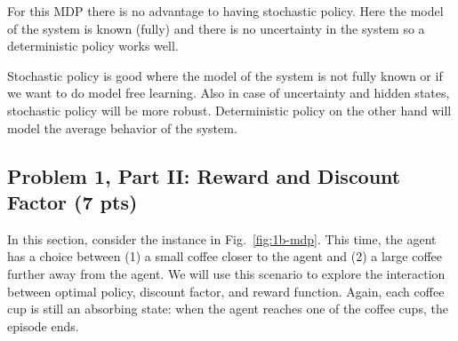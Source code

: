 \documentclass[12pt]{article}
\begin{document}
\begin{enumerate}[a)]
\begin{solution}
For this MDP there is no advantage to having stochastic policy. Here the model of the system is known (fully) and there is no uncertainty in the system so a deterministic policy works well.

Stochastic policy is good where the model of the system is not fully known or if we want to do model free learning. Also in case of uncertainty and hidden states, stochastic policy will be more robust. Deterministic policy on the other hand will model the average behavior of the system. 

\end{solution}

\end{enumerate}

\subsection*{Problem 1, Part II: Reward and Discount Factor (7 pts)}

In this section, consider the instance in Fig.~\ref{fig:1b-mdp}. This time, the agent has a choice between (1) a small coffee closer to the agent and (2) a large coffee further away from the agent. We will use this scenario to explore the interaction between optimal policy, discount factor, and reward function. Again, each coffee cup is still an absorbing state: when the agent reaches one of the coffee cups, the episode ends.
\end{document}
